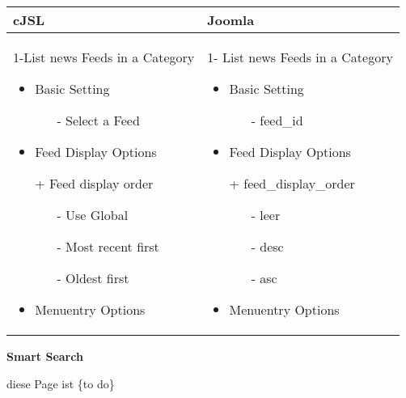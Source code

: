 \begin{minipage}{0.7\textwidth}
\begin{tabular}{|p{} | p{}|}
\hline
\textbf{cJSL} & \textbf{Joomla} \\ 
\hline
 1-List news Feeds in a Category
   \begin{itemize}
     \item Basic  Setting 
    		\begin{enumerate}
    			\item[-] Select a Feed
    		\end{enumerate}  
    \item Feed Display Options
    \item[+] Feed display order
           	\begin{enumerate}
           		\item[-] Use Global
           		\item[-] Most recent first
           		\item[-] Oldest first
           	\end{enumerate}	
 	\item Menuentry Options
  \end{itemize}
 & 
1- List news Feeds in a Category
  \begin{itemize}
    \item Basic  Setting 
   		\begin{enumerate}
   			\item[-] feed\_id
   		\end{enumerate}
   	\item Feed Display Options
   		\item[+] feed\_display\_order
   	   	\begin{enumerate}
   	   		\item[-] leer
   	   		\item[-] desc
   	   		\item[-] asc
   	   	\end{enumerate}	
	\item Menuentry Options
 \end{itemize}
\\
\hline
\end{tabular}
\end{minipage}

\textbf{Smart Search}

diese Page ist \{to do\}

